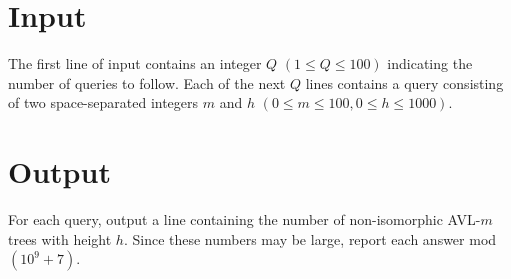 \section*{Input}

The first line of input contains an integer $Q$ $(1 \leq Q \leq 100)$ indicating the number
of queries to follow.  Each of the next $Q$ lines contains a query consisting of two
space-separated integers $m$ and $h$ $(0 \leq m \leq 100, 0 \leq h \leq 1000)$.


\section*{Output}

For each query, output a line containing the number of non-isomorphic \mbox{AVL-$m$} trees
with height $h$. Since these numbers may be large, report each answer mod $(10^9+7)$.

